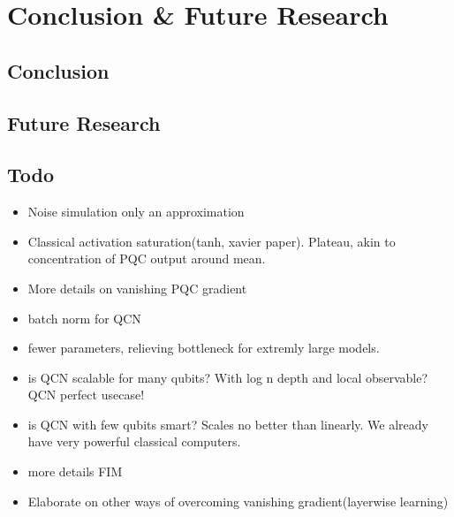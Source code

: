 \chapter{Conclusion \& Future Research}\label{chap:Conclusion}

\section{Conclusion}\label{sec:conclusion}


\section{Future Research}\label{sec:future}


\section{Todo}\label{sec:todo}

\begin{itemize}
    \item Noise simulation only an approximation
    \item Classical activation saturation(tanh, xavier paper). Plateau, akin to concentration of PQC output around mean.  
    \item More details on vanishing PQC gradient
    \item batch norm for QCN
    \item fewer parameters, relieving bottleneck for extremly large models. 
    \item is QCN scalable for many qubits? With log n depth and local observable? QCN perfect usecase!
    \item is QCN with few qubits smart? Scales no better than linearly. We already have very powerful classical computers. 
    \item more details FIM
    \item Elaborate on other ways of overcoming vanishing gradient(layerwise learning)
\end{itemize}